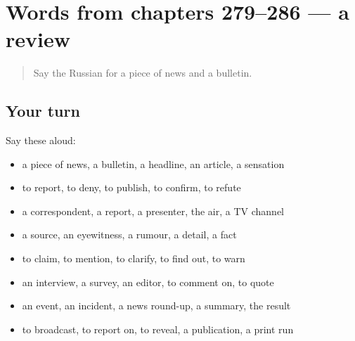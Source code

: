 \section[(dialogue)]{Words from chapters 279–286 — a review}

\label{lesson:RU-R286-review-279-286}



\begin{quote}
Say the Russian for a piece of news and a bulletin.
\end{quote}

\subsection*{Your turn}
Say these aloud:

\begin{itemize}
\raggedright
  \item a piece of news, a bulletin, a headline, an article, a sensation
  \item to report, to deny, to publish, to confirm, to refute
  \item a correspondent, a report, a presenter, the air, a TV channel
  \item a source, an eyewitness, a rumour, a detail, a fact
  \item to claim, to mention, to clarify, to find out, to warn
  \item an interview, a survey, an editor, to comment on, to quote
  \item an event, an incident, a news round-up, a summary, the result
  \item to broadcast, to report on, to reveal, a publication, a print run
\end{itemize}

